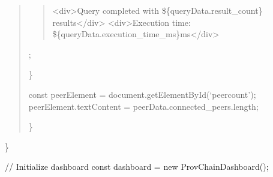 \documentclass[letterpaper,10pt,english]{sphinxmanual}
\begin{document}
\begin{quote}
\begin{description}
\begin{quote}
\sphinxAtStartPar
\textless{}div\textgreater{}Query completed with \$\{queryData.result\_count\} results\textless{}/div\textgreater{}
\textless{}div\textgreater{}Execution time: \$\{queryData.execution\_time\_ms\}ms\textless{}/div\textgreater{}
\end{quote}

\sphinxAtStartPar
{\color{red}\bfseries{}\textasciigrave{}};

\end{description}

\sphinxAtStartPar
\}
\begin{description}
\sphinxAtStartPar
const peerElement = document.getElementById(‘peer\sphinxhyphen{}count’);
peerElement.textContent = peerData.connected\_peers.length;

\end{description}

\sphinxAtStartPar
\}
\end{quote}

\sphinxAtStartPar
\}

\sphinxAtStartPar
// Initialize dashboard
const dashboard = new ProvChainDashboard();
{\color{red}\bfseries{}\textasciigrave{}\textasciigrave{}}{\color{red}\bfseries{}\textasciigrave{}}
\end{document}
